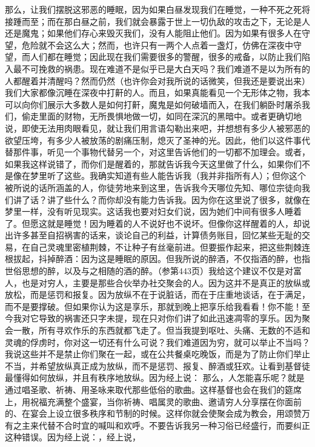 那么，让我们摆脱这邪恶的睡眠，因为如果白昼发现我们在睡觉，一种不死之死将接踵而至；而在那白昼之前，我们就会暴露于世上一切仇敌的攻击之下，无论是人还是魔鬼；如果他们存心来毁灭我们，没有人能阻止他们。因为如果有很多人在守望，危险就不会这么大；然而，也许只有一两个人点着一盏灯，仿佛在深夜中守望，而人们都在睡觉；因此现在我们需要很多的警醒，很多的戒备，以防止我们陷入最不可挽救的祸患。现在难道不是似乎已是大白天吗？我们难道不是以为所有的人都醒着并清醒吗？然而仍然（也许你会对我所说的话微笑，但我还是要说出来）我们大家都像沉睡在深夜中打鼾的人。而且，如果真能看见一个无形体之物，我本可以向你们展示大多数人是如何打鼾，魔鬼是如何破墙而入，在我们躺卧时屠杀我们，偷走里面的财物，无所畏惧地做一切，如同在深沉的黑暗中。或者更确切地说，即使无法用肉眼看见，就让我们用言语勾勒出来吧，并想想有多少人被邪恶的欲望压垮，有多少人被放荡的剧痛压制，熄灭了圣神的光。因此，他们以这件事代替那件事，听见一个事物代替另一个，对这里告诉他们的一切都不加理会。或者，如果我这样说错了，而你们是醒着的，那就告诉我今天这里做了什么，如果你们不是像在梦里听了这些。我确实知道有些人能告诉我（我并非指所有人）；但你这个被所说的话所涵盖的人，你徒劳地来到这里，告诉我今天哪位先知、哪位宗徒向我们讲了话？讲了些什么？而你却没有能力告诉我。因为你在这里说了很多，就像在梦里一样，没有听见现实。这话我也要对妇女们说，因为她们中间有很多人睡着了。但愿这就是睡觉！因为睡着的人不说好也不说坏。但像你这样醒着的人，却说出许多甚至自招祸害的话来，谈论自己的利益，计算债务账目，回忆某些无耻的交易，在自己灵魂里密植荆棘，不让种子有丝毫前进。但要振作起来，把这些荆棘连根拔起，抖掉醉酒：因为这是睡眠的原因。但我所说的醉酒，不仅指酒的醉，也指世俗思想的醉，以及与之相随的酒的醉。（参第443页）我给这个建议不仅是对富人，也是对穷人，主要是那些合伙举办社交聚会的人。因为这并不是真正的放纵或放松，而是惩罚和报复。因为放纵不在于说脏话，而在于庄重地谈话，在于满足，而不是要撑破。但如果你认为这是享乐，那就到晚上把享乐给我看看！你不能！至今我对它导致的祸害还只字未提，现在只对你们讲了如此迅速凋零的享乐。因为聚会一散，所有寻欢作乐的东西就都飞走了。但当我提到呕吐、头痛、无数的不适和灵魂的俘虏时，你对这一切还有什么可说？我们难道因为穷，就可以举止不当吗？我说这些并不是禁止你们聚在一起，或在公共餐桌吃晚饭，而是为了防止你们举止不当，并希望放纵真正成为放纵，而不是惩罚、报复、醉酒或狂欢。让看到基督徒最懂得如何放纵，并且有秩序地放纵。因为经上说：  那么，人怎能喜乐呢？就是通过唱圣歌、祈祷、用圣咏来取代那些低俗的歌曲。这样基督也会在我们的筵席上，用祝福充满整个盛宴，当你祈祷、唱属灵的歌曲、邀请穷人分享摆在你面前的、在宴会上设立很多秩序和节制的时候。这样你就会使聚会成为教会，用颂赞万有之主来代替不合时宜的喊叫和欢呼。不要告诉我另一种习俗已经盛行，而要纠正这种错误。因为经上说：，经上说，  